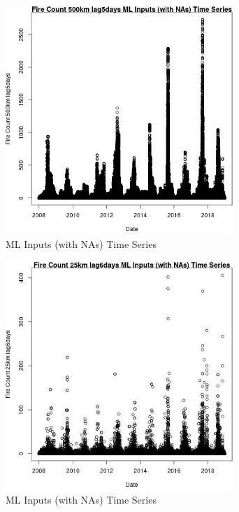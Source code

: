 \begin{figure} 
\centering  
\includegraphics[width=0.77\textwidth]{Code_Outputs/Report_ML_input_PM25_Step4_part_f_de_duplicated_aves_prioritize_24hr_obswNAs_Fire_Count_500km_lag5daysvDate.jpg} 
\caption{\label{fig:Report_ML_input_PM25_Step4_part_f_de_duplicated_aves_prioritize_24hr_obswNAsFire_Count_500km_lag5daysvDate}ML Inputs (with NAs) Time Series} 
\end{figure} 
 

\begin{figure} 
\centering  
\includegraphics[width=0.77\textwidth]{Code_Outputs/Report_ML_input_PM25_Step4_part_f_de_duplicated_aves_prioritize_24hr_obswNAs_Fire_Count_25km_lag6daysvDate.jpg} 
\caption{\label{fig:Report_ML_input_PM25_Step4_part_f_de_duplicated_aves_prioritize_24hr_obswNAsFire_Count_25km_lag6daysvDate}ML Inputs (with NAs) Time Series} 
\end{figure} 
 

